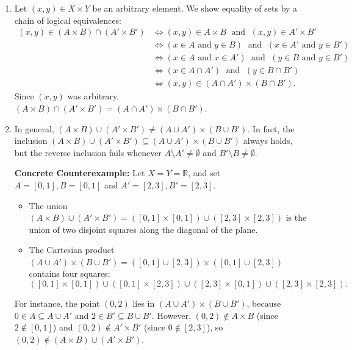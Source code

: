 \begin{exercisesolution}
\label{sol:cartesian_product_intersections}
\begin{enumerate}[label=\textbf{(\alph*)}]
    \item Let $(x, y) \in X \times Y$ be an arbitrary element. We show equality of sets by a chain of logical equivalences:
    \begin{align*}
    (x, y) \in (A \times B) \cap (A' \times B') &\iff (x, y) \in A \times B \;\text{ and }\; (x, y) \in A' \times B' \\
    &\iff (x \in A \text{ and } y \in B) \;\text{ and }\; (x \in A' \text{ and } y \in B') \\
    &\iff (x \in A \text{ and } x \in A') \;\text{ and }\; (y \in B \text{ and } y \in B') \\
    &\iff (x \in A \cap A') \;\text{ and }\; (y \in B \cap B') \\
    &\iff (x, y) \in (A \cap A') \times (B \cap B').
    \end{align*}
    Since $(x,y)$ was arbitrary, $(A \times B) \cap (A' \times B') = (A \cap A') \times (B \cap B')$.

    \item In general, $(A \times B) \cup (A' \times B') \ne (A \cup A') \times (B \cup B')$. In fact, the inclusion $(A \times B) \cup (A' \times B') \subseteq (A \cup A') \times (B \cup B')$ always holds, but the reverse inclusion fails whenever $A \setminus A' \ne \emptyset$ and $B' \setminus B \ne \emptyset$.
    
    \textbf{Concrete Counterexample:} Let $X = Y = \mathbb{R}$, and set $A = [0, 1], B = [0, 1]$ and $A' = [2, 3], B' = [2, 3]$. 
    \begin{itemize}
        \item The union $(A \times B) \cup (A' \times B') = ([0, 1] \times [0, 1]) \cup ([2, 3] \times [2, 3])$ is the union of two disjoint squares along the diagonal of the plane.
        \item The Cartesian product $(A \cup A') \times (B \cup B') = ([0, 1] \cup [2, 3]) \times ([0, 1] \cup [2, 3])$ contains four squares:
        \[
        ([0,1] \times [0,1]) \cup ([0,1] \times [2,3]) \cup ([2,3] \times [0,1]) \cup ([2,3] \times [2,3]).
        \]
    \end{itemize}
    For instance, the point $(0, 2)$ lies in $(A \cup A') \times (B \cup B')$, because $0 \in A \subseteq A \cup A'$ and $2 \in B' \subseteq B \cup B'$. However, $(0, 2) \notin A \times B$ (since $2 \notin [0,1]$) and $(0, 2) \notin A' \times B'$ (since $0 \notin [2,3]$), so $(0, 2) \notin (A \times B) \cup (A' \times B')$.
\end{enumerate}
\end{exercisesolution}

